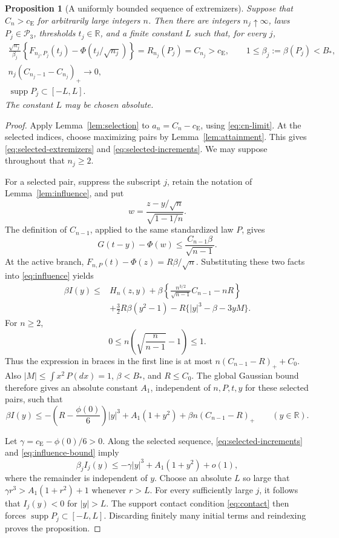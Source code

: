 \documentclass[aop]{imsart}
\theoremstyle{plain}
\newtheorem{proposition}[theorem]{Proposition}
\theoremstyle{definition}
\theoremstyle{definition}
\newcommand{\R}{\mathbb R}
\newcommand{\Pthree}{\mathcal P_3}
\newcommand{\ce}{c_{\mathrm E}}
\DeclareMathOperator{\supp}{supp}
\begin{document}
\begin{proposition}[A uniformly bounded sequence of extremizers]
\label{prop:bounded-extremizers}
Suppose that \(C_n>\ce\) for arbitrarily large integers \(n\). Then
there are integers \(n_j\uparrow\infty\), laws \(P_j\in\Pthree\),
thresholds \(t_j\in\R\), and a finite constant \(L\) such that, for
every \(j\),
\begin{gather}
\label{eq:selected-extremizers}
\frac{\sqrt{n_j}}{\beta_j}
\left\{F_{n_j,P_j}(t_j)-\Phi(t_j/\sqrt{n_j})\right\}
=R_{n_j}(P_j)=C_{n_j}>\ce,
\qquad 1\le\beta_j:=\beta(P_j)<B_*,\\
\label{eq:selected-increments}
n_j(C_{n_j-1}-C_{n_j})_+\longrightarrow0,\\
\label{eq:bounded-extremizer-support}
\supp P_j\subset[-L,L].
\end{gather}
The constant \(L\) may be chosen absolute.
\end{proposition}

\begin{proof}
Apply Lemma~\ref{lem:selection} to \(a_n=C_n-\ce\), using
\eqref{eq:cn-limit}. At the selected indices, choose maximizing
pairs by Lemma~\ref{lem:attainment}. This gives
\eqref{eq:selected-extremizers} and \eqref{eq:selected-increments}.
We may suppose throughout that \(n_j\ge2\).

For a selected pair, suppress the subscript \(j\), retain the notation
of Lemma~\ref{lem:influence}, and put
\[
w=\frac{z-y/\sqrt n}{\sqrt{1-1/n}}.
\]
The definition of \(C_{n-1}\), applied to the same standardized law
\(P\), gives
\[
G(t-y)-\Phi(w)\le\frac{C_{n-1}\beta}{\sqrt{n-1}}.
\]
At the active branch,
\(F_{n,P}(t)-\Phi(z)=R\beta/\sqrt n\). Substituting these two facts into
\eqref{eq:influence} yields
\begin{align*}
\beta I(y)\le{}&H_n(z,y)
+\beta\left\{\frac{n^{3/2}}{\sqrt{n-1}}C_{n-1}-nR\right\}\\
&+\frac32R\beta(y^2-1)-R\{|y|^3-\beta-3yM\}.
\end{align*}
For \(n\ge2\),
\[
0\le n\left(\sqrt{\frac n{n-1}}-1\right)\le1.
\]
Thus the expression in braces in the first line is at most
\(n(C_{n-1}-R)_++C_0\). Also
\(|M|\le\int x^2\,P(dx)=1\), \(\beta<B_*\), and \(R\le C_0\).
The global Gaussian bound therefore gives an absolute constant
\(A_1\), independent of \(n,P,t,y\) for these selected pairs, such that
\begin{equation}
\label{eq:influence-bound}
\beta I(y)\le
-\left(R-\frac{\phi(0)}6\right)|y|^3
+A_1(1+y^2)+\beta n(C_{n-1}-R)_+
\qquad(y\in\R).
\end{equation}

Let \(\gamma=\ce-\phi(0)/6>0\). Along the selected sequence,
\eqref{eq:selected-increments} and \eqref{eq:influence-bound} imply
\[
\beta_jI_j(y)\le-\gamma|y|^3+A_1(1+y^2)+o(1),
\]
where the remainder is independent of \(y\). Choose an absolute \(L\)
so large that
\(\gamma r^3>A_1(1+r^2)+1\) whenever \(r>L\).
For every sufficiently large \(j\), it follows that \(I_j(y)<0\) for
\(|y|>L\). The support contact condition \eqref{eq:contact} then forces
\(\supp P_j\subset[-L,L]\). Discarding finitely many initial terms and
reindexing proves the proposition.
\end{proof}
\end{document}
